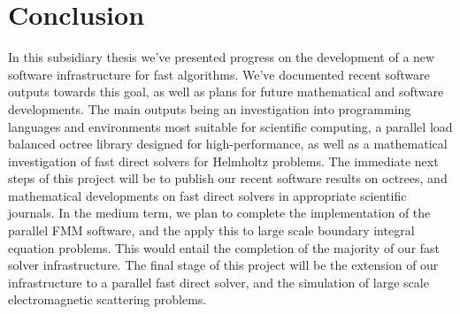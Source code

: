 \chapter{Conclusion}\label{chpt:conclusion}

In this subsidiary thesis we've presented progress on the development of a new software infrastructure for fast algorithms. We've documented recent software outputs towards this goal, as well as plans for future mathematical and software developments. The main outputs being an investigation into programming languages and environments most suitable for scientific computing, a parallel load balanced octree library designed for high-performance,  as well as a mathematical investigation of fast direct solvers for Helmholtz problems. The immediate next steps of this project will be to publish our recent software results on octrees, and mathematical developments on fast direct solvers in appropriate scientific journals. In the medium term, we plan to complete the implementation of the parallel FMM software, and the apply this to large scale boundary integral equation problems. This would entail the completion of the majority of our fast solver infrastructure. The final stage of this project will be the extension of our infrastructure to a parallel fast direct solver, and the simulation of large scale electromagnetic scattering problems.
